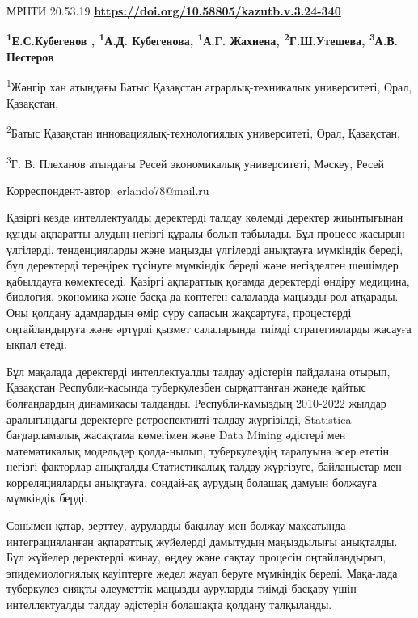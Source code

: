 \newpage
МРНТИ 20.53.19
\hfill {\bfseries \href{https://doi.org/10.58805/kazutb.v.3.24-340}{https://doi.org/10.58805/kazutb.v.3.24-340}}

\begin{center}

{\bfseries \textsuperscript{1}Е.С.Кубегенов \envelope,
\textsuperscript{1}А.Д. Кубегенова, \textsuperscript{1}А.Г. Жахиена,
\textsuperscript{2}Г.Ш.Утешева, \textsuperscript{3}А.В. Нестеров}

\textsuperscript{1}Жәңгір хан атындағы Батыс Қазақстан
аграрлық-техникалық университеті, Орал, Қазақстан,

\textsuperscript{2}Батыс Қазақстан инновациялық-технологиялық
университеті, Орал, Қазақстан,

\textsuperscript{3}Г. В. Плеханов атындағы Ресей экономикалық
университеті, Мәскеу, Ресей
\end{center}
\envelope Корреспондент-автор: erlando78@mail.ru \vspace{0.5cm}

Қазіргі кезде интеллектуалды деректерді талдау көлемді деректер
жиынтығынан құнды ақпаратты алудың негізгі құралы болып табылады. Бұл
процесс жасырын үлгілерді, тенденцияларды және маңызды үлгілерді
анықтауға мүмкіндік береді, бұл деректерді тереңірек түсінуге мүмкіндік
береді және негізделген шешімдер қабылдауға көмектеседі. Қазіргі
ақпараттық қоғамда деректерді өндіру медицина, биология, экономика және
басқа да көптеген салаларда маңызды рөл атқарады. Оны қолдану адамдардың
өмір сүру сапасын жақсартуға, процестерді оңтайландыруға және әртүрлі
қызмет салаларында тиімді стратегияларды жасауға ықпал етеді.

Бұл мақалада деректерді интеллектуалды талдау әдістерін пайдалана
отырып, Қазақстан Республи-касында туберкулезбен сырқаттанған жәнеде
қайтыс болғандардың динамикасы талданды. Республи-камыздың 2010-2022
жылдар аралығындағы деректерге ретроспективті талдау жүргізілді,
Statistica бағдарламалық жасақтама көмегімен және Data Mining әдістері
мен математикалық модельдер қолда-нылып, туберкулездің таралуына әсер
ететін негізгі факторлар анықталды.Статистикалық талдау жүргізуге,
байланыстар мен корреляцияларды анықтауға, сондай-ақ аурудың болашақ
дамуын болжауға мүмкіндік берді.

Сонымен қатар, зерттеу, ауруларды бақылау мен болжау мақсатында
интеграцияланған ақпараттық жүйелерді дамытудың маңыздылығы анықталды.
Бұл жүйелер деректерді жинау, өңдеу және сақтау процесін оңтайландырып,
эпидемиологиялық қауіптерге жедел жауап беруге мүмкіндік береді.
Мақа-лада туберкулез сияқты әлеуметтік маңызды ауруларды тиімді басқару
үшін интеллектуалды талдау әдістерін болашақта қолдану талқыланды.

